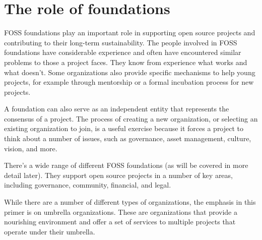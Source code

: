 


\chapter{The role of foundations}

FOSS foundations play an important role in supporting open source projects and contributing to their long-term sustainability.  The people involved in FOSS foundations have considerable experience and often have encountered similar problems to those a project faces.  They know from experience what works and what doesn't.  Some organizations also provide specific mechanisms to help young projects, for example through mentorship or a formal incubation process for new projects.

A foundation can also serve as an independent entity that represents the consensus of a project.  The process of creating a new organization, or selecting an existing organization to join, is a useful exercise because it forces a project to think about a number of issues, such as governance, asset management, culture, vision, and more.

There's a wide range of different FOSS foundations (as will be covered in more detail later).  They support open source projects in a number of key areas, including governance, community, financial, and legal.

While there are a number of different types of organizations, the emphasis in this primer is on umbrella organizations.  These are organizations that provide a nourishing environment and offer a set of services to multiple projects that operate under their umbrella.

